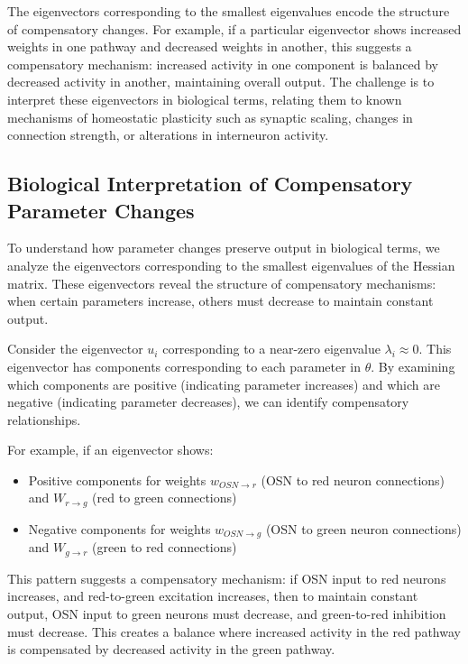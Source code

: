 \documentclass[12pt]{article}
\begin{document}
The eigenvectors corresponding to the smallest eigenvalues encode the structure of compensatory changes. For example, if a particular eigenvector shows increased weights in one pathway and decreased weights in another, this suggests a compensatory mechanism: increased activity in one component is balanced by decreased activity in another, maintaining overall output. The challenge is to interpret these eigenvectors in biological terms, relating them to known mechanisms of homeostatic plasticity such as synaptic scaling, changes in connection strength, or alterations in interneuron activity.

\subsection{Biological Interpretation of Compensatory Parameter Changes}

To understand how parameter changes preserve output in biological terms, we analyze the eigenvectors corresponding to the smallest eigenvalues of the Hessian matrix. These eigenvectors reveal the structure of compensatory mechanisms: when certain parameters increase, others must decrease to maintain constant output.

Consider the eigenvector $u_i$ corresponding to a near-zero eigenvalue $\lambda_i \approx 0$. This eigenvector has components corresponding to each parameter in $\theta$. By examining which components are positive (indicating parameter increases) and which are negative (indicating parameter decreases), we can identify compensatory relationships.

For example, if an eigenvector shows:
\begin{itemize}
    \item Positive components for weights $w_{OSN \to r}$ (OSN to red neuron connections) and $W_{r \to g}$ (red to green connections)
    \item Negative components for weights $w_{OSN \to g}$ (OSN to green neuron connections) and $W_{g \to r}$ (green to red connections)
\end{itemize}

This pattern suggests a compensatory mechanism: if OSN input to red neurons increases, and red-to-green excitation increases, then to maintain constant output, OSN input to green neurons must decrease, and green-to-red inhibition must decrease. This creates a balance where increased activity in the red pathway is compensated by decreased activity in the green pathway.
\end{document}
